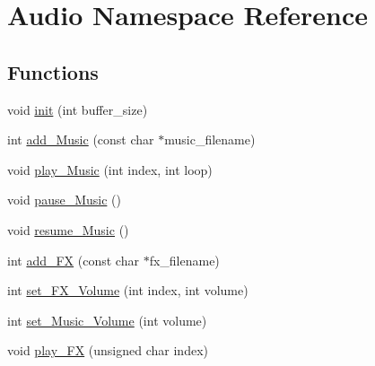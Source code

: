 \hypertarget{namespace_audio}{}\section{Audio Namespace Reference}
\label{namespace_audio}
\subsection*{Functions}
\begin{DoxyCompactItemize}
\item 
void \mbox{\hyperlink{namespace_audio_ace2497ef479633bcdaa8239458a4f3e9}{init}} (int buffer\+\_\+size)
\item 
int \mbox{\hyperlink{namespace_audio_a2be55422c7a9a1eed7d50918d9a8ab91}{add\+\_\+\+Music}} (const char $\ast$music\+\_\+filename)
\item 
void \mbox{\hyperlink{namespace_audio_aecf70d4a84be264b86d756ba19debecb}{play\+\_\+\+Music}} (int index, int loop)
\item 
void \mbox{\hyperlink{namespace_audio_a4ce3b7bd257437e473a5e08cb0caa618}{pause\+\_\+\+Music}} ()
\item 
void \mbox{\hyperlink{namespace_audio_a63494250332225f4242346bf5ad61bd8}{resume\+\_\+\+Music}} ()
\item 
int \mbox{\hyperlink{namespace_audio_a74272f7cb6f9113f1ab6308c82bda0f5}{add\+\_\+\+FX}} (const char $\ast$fx\+\_\+filename)
\item 
int \mbox{\hyperlink{namespace_audio_a1e761e7a5934993a65f5b446aa8bd78f}{set\+\_\+\+F\+X\+\_\+\+Volume}} (int index, int volume)
\item 
int \mbox{\hyperlink{namespace_audio_af4d828b08d1d7c214a67c65af34f54ee}{set\+\_\+\+Music\+\_\+\+Volume}} (int volume)
\item 
void \mbox{\hyperlink{namespace_audio_a8efc389bdd994d729c09970f87c9f707}{play\+\_\+\+FX}} (unsigned char index)
\end{DoxyCompactItemize}
